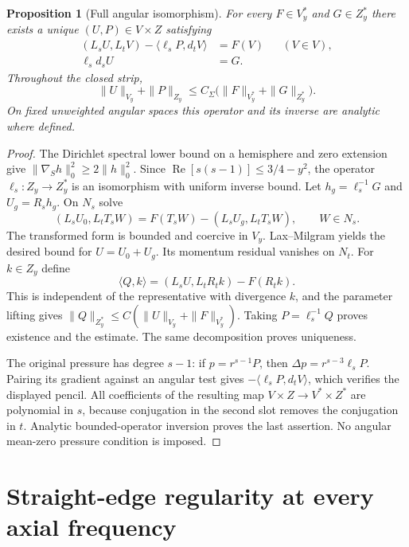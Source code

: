 \documentclass[11pt,a4paper]{article}
\newtheorem{proposition}[theorem]{Proposition}
\theoremstyle{remark}
\numberwithin{equation}{section}
\begin{document}
\begin{proposition}[Full angular isomorphism]\label{prop:g-mixedpencil}
For every $F\in V_y^*$ and $G\in Z_y^*$ there exists a unique $(U,P)\in V\times Z$
satisfying
\begin{equation}\label{eq:g-mixed-angular-system}
\begin{aligned}
 (L_sU,L_tV)-\langle\ell_sP,d_tV\rangle&=F(V)
       &&(V\in V),\\
 \ell_sd_sU&=G.
\end{aligned}
\end{equation}
Throughout the closed strip,
\begin{equation}\label{eq:g-mixed-angular-estimate}
 \|U\|_{V_y}+\|P\|_{Z_y}
 \le C_\Sigma\bigl(\|F\|_{V_y^*}+\|G\|_{Z_y^*}\bigr).
\end{equation}
On fixed unweighted angular spaces this operator and its inverse are analytic
where defined.
\end{proposition}
\begin{proof}
The Dirichlet spectral lower bound on a hemisphere and zero extension give
$\|\nabla_Sh\|_0^2\ge2\|h\|_0^2$. Since
$\operatorname{Re}[s(s-1)]\le3/4-y^2$, the operator
$\ell_s:Z_y\to Z_y^*$ is an isomorphism with uniform inverse bound.
Let $h_g=\ell_s^{-1}G$ and $U_g=R_sh_g$. On $N_s$ solve
\[
 (L_sU_0,L_tT_sW)=F(T_sW)-(L_sU_g,L_tT_sW),\qquad W\in N_s.
\]
The transformed form is bounded and coercive in $V_y$. Lax--Milgram yields
the desired bound for $U=U_0+U_g$. Its momentum residual vanishes on $N_t$.
For $k\in Z_y$ define
\[
 \langle Q,k\rangle=(L_sU,L_tR_tk)-F(R_tk).
\]
This is independent of the representative with divergence $k$, and the
parameter lifting gives $\|Q\|_{Z_y^*}\le C(\|U\|_{V_y}+\|F\|_{V_y^*})$.
Taking $P=\ell_s^{-1}Q$ proves existence and the estimate. The same
decomposition proves uniqueness.

The original pressure has degree $s-1$: if $p=r^{s-1}P$, then
$\Delta p=r^{s-3}\ell_sP$. Pairing its gradient against an angular test
gives $-\langle\ell_sP,d_tV\rangle$, which verifies the displayed pencil.
All coefficients of the resulting map
$V\times Z\to V^*\times Z^*$ are polynomial in $s$, because conjugation
in the second slot removes the conjugation in $t$. Analytic bounded-operator
inversion proves the last assertion. No angular mean-zero pressure condition
is imposed.
\end{proof}

\section{Straight-edge regularity at every axial frequency}
\label{sec:g-edges}
\end{document}
